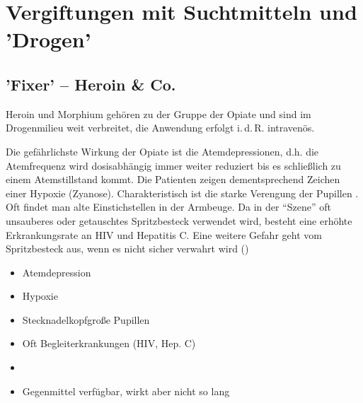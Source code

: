 
\section{Vergiftungen mit Suchtmitteln und 'Drogen'}

\subsection{'Fixer' -- Heroin \& Co.}

Heroin und Morphium gehören zu der Gruppe der Opiate und
sind im Drogenmilieu weit verbreitet, die Anwendung erfolgt
i.\,d.\,R. intravenös. 

{
Die gefährlichste Wirkung der Opiate ist die
Atemdepressionen, d.h. die Atemfrequenz wird dosisabhängig
immer weiter reduziert bis es schließlich zu einem
Atemstillstand kommt. Die Patienten zeigen
dementsprechend Zeichen einer Hypoxie
(Zyanose). Charakteristisch ist die starke Verengung der
Pupillen . Oft
findet man alte Einstichstellen in der Armbeuge. Da in der
"`Szene"' oft unsauberes oder getauschtes Spritzbesteck
verwendet wird, besteht eine erhöhte Erkrankungsrate an HIV
und Hepatitis C. Eine weitere Gefahr geht vom Spritzbesteck
aus, wenn es nicht sicher verwahrt wird ()
}{
\begin{itemize}
    \item Atemdepression
    \item Hypoxie
    \item Stecknadelkopfgroße Pupillen
    \item Oft Begleiterkrankungen (HIV, Hep. C) 
    \item {}
    \item Gegenmittel verfügbar, wirkt aber nicht so lang
\end{itemize}
}{}{}{}

